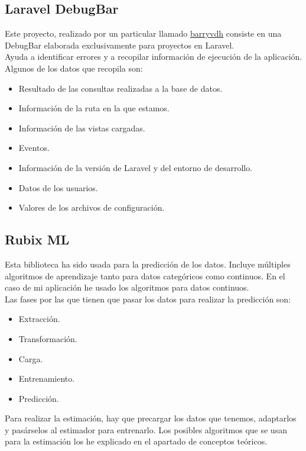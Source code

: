 \subsection{Laravel DebugBar}
Este proyecto, realizado por un particular llamado \href{https://github.com/barryvdh}{barryvdh} consiste en una DebugBar elaborada exclusivamente para proyectos en Laravel.\\
Ayuda a identificar errores y a recopilar información de ejecución de la aplicación. Algunos de los datos que recopila son:
\begin{itemize}
    \item Resultado de las consultas realizadas a la base de datos.
    \item Información de la ruta en la que estamos.
    \item Información de las vistas cargadas.
    \item Eventos.
    \item Información de la versión de Laravel y del entorno de desarrollo.
    \item Datos de los usuarios.
    \item Valores de los archivos de configuración.
\end{itemize}
\subsection{Rubix ML}
Esta biblioteca ha sido usada para la predicción de los datos. Incluye múltiples algoritmos de aprendizaje tanto para datos categóricos como continuos. En el caso de mi aplicación he usado los algoritmos para datos continuos.\\
Las fases por las que tienen que pasar los datos para realizar la predicción son:
\begin{itemize}
    \item Extracción.
    \item Transformación.
    \item Carga.
    \item Entrenamiento.
    \item Predicción.
\end{itemize}
Para realizar la estimación, hay que precargar los datos que tenemos, adaptarlos y pasárselos al estimador para entrenarlo. Los posibles algoritmos que se usan para la estimación los he explicado en el apartado de conceptos teóricos.
